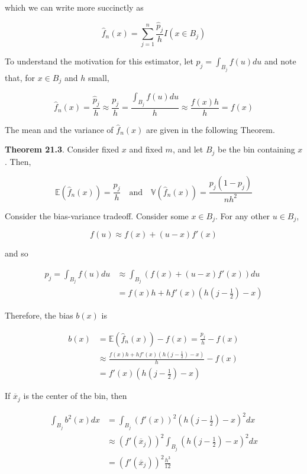 which we can write more succinctly as

\[ \hat{f}_{n}(x) = \sum_{j=1}^{n} \frac{\hat{p}_{j}}{h} I(x \in B_{j}) \]

To understand the motivation for this estimator, let
\(p_{j} = \int_{B_{j}} f(u) du\) and note that, for \(x \in B_{j}\) and \(h\)
small,

\[ \hat{f}_{n}(x) = \frac{\hat{p}_{j}}{h} \approx \frac{p_{j}}{h} = \frac{\int_{B_{j}} f(u) du}{h} \approx \frac{f(x) h}{h} = f(x) \]

The mean and the variance of \(\hat{f}_{n}(x)\) are given in the following
Theorem.

\textbf{Theorem 21.3}. Consider fixed \(x\) and fixed \(m\), and let
\(B_{j}\) be the bin containing \(x\). Then,

\[ 
\mathbb{E}(\hat{f}_{n}(x)) = \frac{p_{j}}{h} 
\quad \text{and} \quad
\mathbb{V}(\hat{f}_{n}(x)) = \frac{p_{j} (1 - p_{j})}{nh^{2}}
\]

Consider the bias-variance tradeoff. Consider some
\(x \in B_{j}\). For any other \(u \in B_{j}\),

\[ f(u) \approx f(x) + (u - x) f'(x) \]

and so

\begin{align*}
p_{j} = \int_{B_{j}} f(u) du &\approx \int_{B_{j}} (f(x) + (u - x) f'(x)) du \\
&= f(x) h + h f'(x) \left(h \left(j - \frac{1}{2} \right) - x \right)
\end{align*}

Therefore, the bias \(b(x)\) is

\begin{align*}
b(x) &= \mathbb{E}(\hat{f}_{n}(x)) - f(x) = \frac{p_{j}}{h} - f(x) \\
&\approx \frac{f(x) h + h f'(x) \left(h \left(j - \frac{1}{2} \right) - x \right)}{h} - f(x) \\
&= f'(x) \left(h \left(j - \frac{1}{2} \right) - x \right)
\end{align*}

If \(\overline{x}_{j}\) is the center of the bin, then

\begin{align*}
\int_{B_{j}} b^{2}(x) dx &= \int_{B_{j}} (f'(x))^{2} \left(h \left(j - \frac{1}{2} \right) - x \right)^{2} dx \\
&\approx (f'(\overline{x}_{j}))^{2} \int_{B_{j}} \left(h \left(j - \frac{1}{2} \right) - x \right)^{2} dx \\
&= (f'(\overline{x}_{j}))^{2} \frac{h^{3}}{12}
\end{align*}

